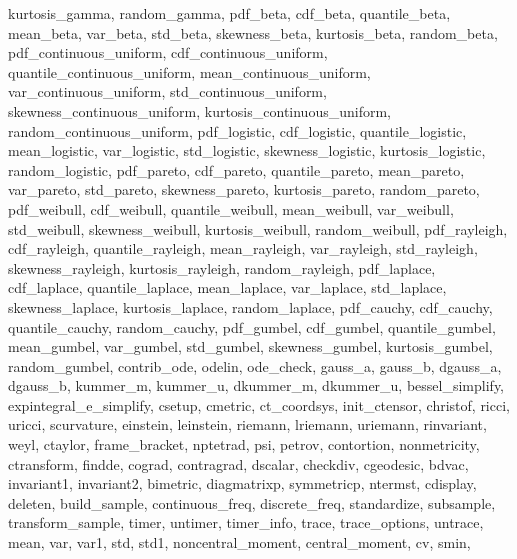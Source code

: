 {{    kurtosis_gamma,
    random_gamma,
    pdf_beta,
    cdf_beta,
    quantile_beta,
    mean_beta,
    var_beta,
    std_beta,
    skewness_beta,
    kurtosis_beta,
    random_beta,
    pdf_continuous_uniform,
    cdf_continuous_uniform,
    quantile_continuous_uniform,
    mean_continuous_uniform,
    var_continuous_uniform,
    std_continuous_uniform,
    skewness_continuous_uniform,
    kurtosis_continuous_uniform,
    random_continuous_uniform,
    pdf_logistic,
    cdf_logistic,
    quantile_logistic,
    mean_logistic,
    var_logistic,
    std_logistic,
    skewness_logistic,
    kurtosis_logistic,
    random_logistic,
    pdf_pareto,
    cdf_pareto,
    quantile_pareto,
    mean_pareto,
    var_pareto,
    std_pareto,
    skewness_pareto,
    kurtosis_pareto,
    random_pareto,
    pdf_weibull,
    cdf_weibull,
    quantile_weibull,
    mean_weibull,
    var_weibull,
    std_weibull,
    skewness_weibull,
    kurtosis_weibull,
    random_weibull,
    pdf_rayleigh,
    cdf_rayleigh,
    quantile_rayleigh,
    mean_rayleigh,
    var_rayleigh,
    std_rayleigh,
    skewness_rayleigh,
    kurtosis_rayleigh,
    random_rayleigh,
    pdf_laplace,
    cdf_laplace,
    quantile_laplace,
    mean_laplace,
    var_laplace,
    std_laplace,
    skewness_laplace,
    kurtosis_laplace,
    random_laplace,
    pdf_cauchy,
    cdf_cauchy,
    quantile_cauchy,
    random_cauchy,
    pdf_gumbel,
    cdf_gumbel,
    quantile_gumbel,
    mean_gumbel,
    var_gumbel,
    std_gumbel,
    skewness_gumbel,
    kurtosis_gumbel,
    random_gumbel,
    contrib_ode,
    odelin,
    ode_check,
    gauss_a,
    gauss_b,
    dgauss_a,
    dgauss_b,
    kummer_m,
    kummer_u,
    dkummer_m,
    dkummer_u,
    bessel_simplify,
    expintegral_e_simplify,
    csetup,
    cmetric,
    ct_coordsys,
    init_ctensor,
    christof,
    ricci,
    uricci,
    scurvature,
    einstein,
    leinstein,
    riemann,
    lriemann,
    uriemann,
    rinvariant,
    weyl,
    ctaylor,
    frame_bracket,
    nptetrad,
    psi,
    petrov,
    contortion,
    nonmetricity,
    ctransform,
    findde,
    cograd,
    contragrad,
    dscalar,
    checkdiv,
    cgeodesic,
    bdvac,
    invariant1,
    invariant2,
    bimetric,
    diagmatrixp,
    symmetricp,
    ntermst,
    cdisplay,
    deleten,
    build_sample,
    continuous_freq,
    discrete_freq,
    standardize,
    subsample,
    transform_sample,
    timer,
    untimer,
    timer_info,
    trace,
    trace_options,
    untrace,
    mean,
    var,
    var1,
    std,
    std1,
    noncentral_moment,
    central_moment,
    cv,
    smin,
}}

